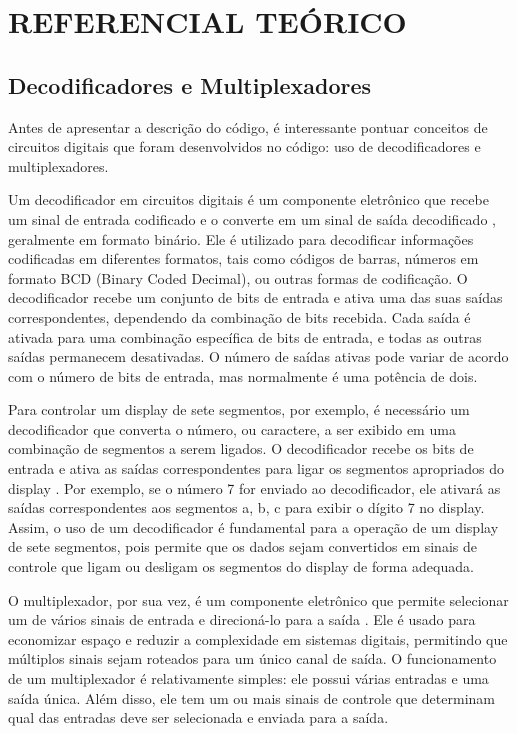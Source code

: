 \chapter{REFERENCIAL TEÓRICO}


\section{Decodificadores e Multiplexadores}
Antes de apresentar a descrição do código, é interessante pontuar conceitos de circuitos digitais que foram desenvolvidos no código: uso de decodificadores e multiplexadores.

Um decodificador em circuitos digitais é um componente eletrônico que recebe um sinal de entrada codificado e o converte em um sinal de saída decodificado \cite{floyd}, geralmente em formato binário. Ele é utilizado para decodificar informações codificadas em diferentes formatos, tais como códigos de barras, números em formato BCD (Binary Coded Decimal), ou outras formas de codificação. O decodificador recebe um conjunto de bits de entrada e ativa uma das suas saídas correspondentes, dependendo da combinação de bits recebida. Cada saída é ativada para uma combinação específica de bits de entrada, e todas as outras saídas permanecem desativadas. O número de saídas ativas pode variar de acordo com o número de bits de entrada, mas normalmente é uma potência de dois.

Para controlar um display de sete segmentos, por exemplo, é necessário um decodificador que converta o número, ou caractere, a ser exibido em uma combinação de segmentos a serem ligados. O decodificador recebe os bits de entrada e ativa as saídas correspondentes para ligar os segmentos apropriados do display \cite{tocci2010sistemas}. Por exemplo, se o número 7 for enviado ao decodificador, ele ativará as saídas correspondentes aos segmentos a, b, c para exibir o dígito 7 no display. Assim, o uso de um decodificador é fundamental para a operação de um display de sete segmentos, pois permite que os dados sejam convertidos em sinais de controle que ligam ou desligam os segmentos do display de forma adequada.

O multiplexador, por sua vez, é um componente eletrônico que permite selecionar um de vários sinais de entrada e direcioná-lo para a saída \cite{floyd}. Ele é usado para economizar espaço e reduzir a complexidade em sistemas digitais, permitindo que múltiplos sinais sejam roteados para um único canal de saída. O funcionamento de um multiplexador é relativamente simples: ele possui várias entradas e uma saída única. Além disso, ele tem um ou mais sinais de controle que determinam qual das entradas deve ser selecionada e enviada para a saída. 

